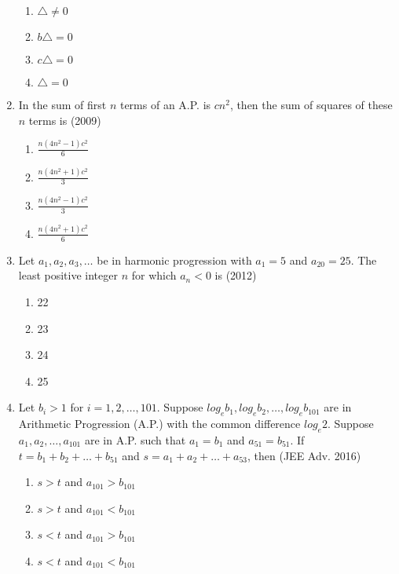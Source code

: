 \documentclass[journal,12pt,twocolumn]{IEEEtran}
\theoremstyle{remark}
\begin{document}
\begin{enumerate}
                \begin{enumerate}
                    \item $\triangle\neq0$
                    \item $b\triangle=0$
                    \item $c\triangle=0$
                    \item $\triangle=0$
                \end{enumerate}
\item In the sum of first $n$ terms of an A.P. is $cn^2$, then the sum of squares of these $n$ terms is \hfill(2009)
                \begin{enumerate}
                    \item $\frac{n(4n^2-1)c^2}{6}$
                    \item $\frac{n(4n^2+1)c^2}{3}$
                    \item $\frac{n(4n^2-1)c^2}{3}$
                    \item $\frac{n(4n^2+1)c^2}{6}$
		\end{enumerate}              \item Let ${a_1,a_2,a_3,\dots}$ be in harmonic progression with ${a_1}=5$ and ${a_{20}}=25$. The least positive integer $n$ for which ${a_n<0}$ is \hfill(2012)
                \begin{enumerate}
                    \item 22
                    \item 23
                    \item 24
                    \item 25
                    \end{enumerate}
\item Let ${b_i}>1$ for $i=1,2,\dots,101$. Suppose ${log_e}{b_1},{log_e}{b_2},\dots,{log_e}{b_{101}}$ are in Arithmetic Progression (A.P.) with the common difference ${log_e}2$. Suppose ${a_1,a_2,\dots,a_{101}}$ are in A.P. such that ${a_1=b_1}$ and ${a_{51}=b_{51}}$. If $t={b_1+b_2+\dots+b_{51}}$ and $s={a_1+a_2+\dots+a_{53}}$, then \hfill (JEE Adv. 2016)
                    \begin{enumerate}
                        \item $s>t$ and ${a_{101}>b_{101}}$
                        \item $s>t$ and ${a_{101}<b_{101}}$
                        \item $s<t$ and ${a_{101}>b_{101}}$
                        \item $s<t$ and ${a_{101}<b_{101}}$
                        \end{enumerate}
                        
    
\end{enumerate}
\end{document}
